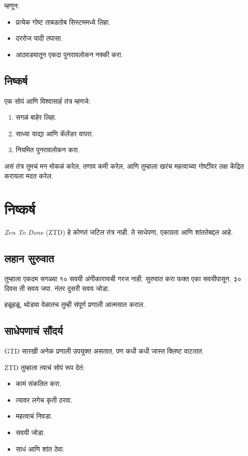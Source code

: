 म्हणून:  
\begin{itemize}
\item प्रत्येक गोष्ट ताबडतोब सिस्टममध्ये लिहा.  
\item दररोज यादी तपासा.  
\item आठवड्यातून एकदा पुनरावलोकन नक्की करा.  
\end{itemize}

\section*{निष्कर्ष}
एक सोपं आणि विश्वासार्ह तंत्र म्हणजे:  
\begin{enumerate}
\item सगळं बाहेर लिहा.  
\item साध्या याद्या आणि कॅलेंडर वापरा.  
\item नियमित पुनरावलोकन करा.  
\end{enumerate}

असं तंत्र तुमचं मन मोकळं करेल,  
तणाव कमी करेल,  
आणि तुम्हाला खरंच महत्वाच्या गोष्टींवर लक्ष केंद्रित करायला मदत करेल.  


\chapter{निष्कर्ष}

\textit{Zen To Done} (ZTD) हे कोणतं जटिल तंत्र नाही.  
ते साधेपणा, एकाग्रता आणि शांततेबद्दल आहे.  

\section*{लहान सुरुवात}
तुम्हाला एकदम सगळ्या १० सवयी अंगीकारायची गरज नाही.  
सुरुवात करा फक्त एका सवयीपासून.  
३० दिवस ती सवय जपा.  
नंतर दुसरी सवय जोडा.  

हळूहळू, थोड्या वेळातच  
तुम्ही संपूर्ण प्रणाली आत्मसात कराल.  

\section*{साधेपणाचं सौंदर्य}
GTD सारखी अनेक प्रणाली उपयुक्त असतात,  
पण कधी कधी जास्त क्लिष्ट वाटतात.  

ZTD तुम्हाला त्याचं सोपं रूप देतं:  
\begin{itemize}
\item कामं संकलित करा.  
\item त्यावर लगेच कृती ठरवा.  
\item महत्वाचं निवडा.  
\item सवयी जोडा.  
\item साधं आणि शांत ठेवा.  
\end{itemize}

